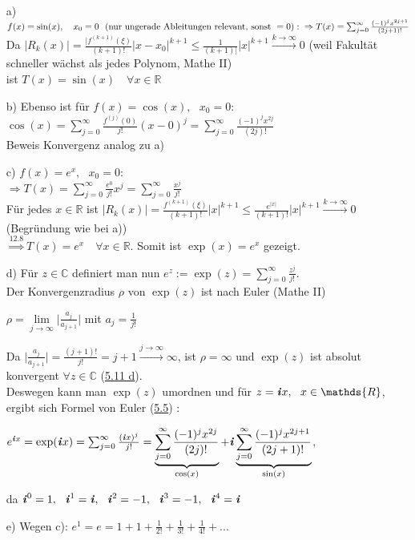 \documentclass[a4paper, 12pt,titlepage, pdf, headsepline]{scrartcl}
\newcommand{\R}{\mathds{R}}
\newcommand{\C}{\mathds{C}}
\renewcommand{\i}{\textbf{\textit{i}}}
\renewcommand{\>}{\rightarrow}
\renewcommand{\*}{\cdot}
\begin{document}
\begin{itemize}
	\item[a)] $f(x) = \sin(x),~~~ x_0 = 0~\text{ (nur ungerade Ableitungen relevant, sonst }=0):\\
	\Rightarrow T(x) = \sum_{j = 0}^{\infty} \frac{(-1)^j x^{2j+1}}{(2j+1)!}$\\
	Da $|R_k(x)| = \frac{|f^{(k+1)} (\xi)}{(k+1)!}|x-x_0|^{k+1} \leq \frac{1}{(k+1)|} |x|^{k+1} \overset{k \rightarrow \infty}{\rightarrow} 0$ (weil Fakultät schneller wächst als jedes Polynom, Mathe II)\\
	ist $T(x) = \sin(x) \quad \forall x \in \R$
	\item[b)] Ebenso ist für $f(x) = \cos(x),~~~ x_0 = 0$:\\
	$\cos(x) =  \sum_{j = 0}^{\infty} \frac{f^{(j)}(0)}{j!} (x-0)^j = \sum_{j = 0}^{\infty} \frac{(-1)^j x^{2j}}{(2j)!}$ \\
	Beweis Konvergenz analog zu a)
	\item[c)] $f(x) = e^x,~~~ x_0 = 0$:\\
	$\Rightarrow T(x) = \sum_{j = 0}^{\infty} \frac{e^0}{j!}x^j = \sum_{j  = 0}^{\infty} \frac{x^j}{j!}$\\
	Für jedes $x \in \R$ ist $|R_k(x)| = \frac{f^{(k+1)}(\xi)}{(k+1)!}|x|^{k+1} \leq \frac{e^{|x|}}{(k+1)!}|x|^{k+1} \overset{k \rightarrow \infty}{\rightarrow} 0$ (Begründung wie bei a))\\
	$\overset{\hyperref[12.8]{12.8}}{\Rightarrow} T(x) = e^x \quad \forall x \in \R$. Somit ist $\exp(x) = e^x$ gezeigt.
	\item[d)] Für $z \in \C$ definiert man nun $e^z := \exp(z) = \sum_{j = 0}^{\infty} \frac{z^j}{j!}$.\\
	Der Konvergenzradius $\rho$ von $\exp(z)$ ist nach Euler (Mathe II)
	\begin{center}
		$\rho = \lim\limits_{j\rightarrow \infty}\Big| \frac{a_j}{a_{j+1}}\Big|$ mit $a_j = \frac{1}{j!}$
	\end{center}
	Da $\Big| \frac{a_j}{a_{j+1}}\Big| = \frac{(j+1)!}{j!} = j+1 \overset{j \rightarrow \infty}{\rightarrow}\infty$, ist $\rho = \infty$ und $\exp(z)$ ist absolut konvergent $\forall z \in \C$ (\hyperref[5.11]{5.11 d}).\\
	Deswegen kann man $\exp(z)$ umordnen und für $z = \i x,~~ x \in \R$, ergibt sich Formel von Euler (\hyperref[5.5]{5.5}) :
	\begin{center}
		$e^{\i x} = \exp(\i x) = \sum_{j = 0}^{\infty} \frac{(\i x)^j}{j!} = \underbrace{\sum_{j = 0}^{\infty} \frac{(-1)^j x^{2j}}{(2j)!}}_{\cos(x)}  + \i\underbrace{\sum_{j = 0}^{\infty} \frac{(-1)^j x^{2j+1}}{(2j+1)!}}_{\sin(x)}$,
	\end{center}
	da $\i^0 = 1,~~ \i^1 = \i,~~ \i^2 = -1,~~ \i^3 = -1,~~\i^4=\i$
	\item[e)] Wegen c): $e^1 = e = 1+1+\frac{1}{2!} + \frac{1}{3!} + \frac{1}{4!} + ...$                                                   
\end{itemize}
\end{document}
